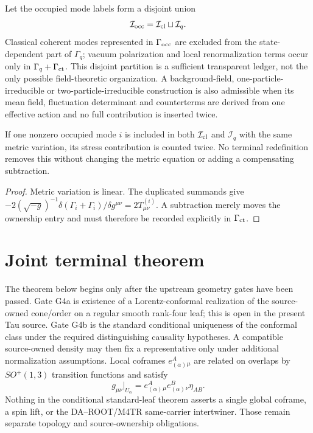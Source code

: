 Let the occupied mode labels form a disjoint union
\begin{equation}
\mathcal I_{\rm occ}=\mathcal I_{\rm cl}\sqcup\mathcal I_q.
\label{eq:partition}
\end{equation}
Classical coherent modes represented in $\Gamma_{\rm occ}$ are excluded from
the state-dependent part of $\Gamma_q$; vacuum polarization and local
renormalization terms occur only in $\Gamma_q+\Gamma_{\rm ct}$.
This disjoint partition is a sufficient transparent ledger, not the only
possible field-theoretic organization. A background-field, one-particle-
irreducible or two-particle-irreducible construction is also admissible when
its mean field, fluctuation determinant and counterterms are derived from one
effective action and no full contribution is inserted twice.

\begin{proposition}
If one nonzero occupied mode $i$ is included in both $\mathcal I_{\rm cl}$ and
$\mathcal I_q$ with the same metric variation, its stress contribution is
counted twice. No terminal redefinition removes this without changing the
metric equation or adding a compensating subtraction.
\end{proposition}
\begin{proof}
Metric variation is linear. The duplicated summands give
$-2(\sqrt{-g})^{-1}\delta(\Gamma_i+\Gamma_i)/\delta g^{\mu\nu}
=2T^{(i)}_{\mu\nu}$. A subtraction merely moves the ownership entry and must
therefore be recorded explicitly in $\Gamma_{\rm ct}$.
\end{proof}

\section{Joint terminal theorem}

The theorem below begins only after the upstream geometry gates have been
passed.  Gate G4a is existence of a Lorentz-conformal realization of the
source-owned cone/order on a regular smooth rank-four leaf; this is open in
the present Tau source.  Gate G4b is the standard conditional uniqueness of
the conformal class under the required distinguishing causality hypotheses.
A compatible source-owned density may then fix a representative only under
additional normalization assumptions.  Local coframes
$e_{(\alpha)}^A{}_{\mu}$ are related on overlaps by
$SO^+(1,3)$ transition functions and satisfy
\[
 g_{\mu\nu}|_{U_\alpha}
 =e_{(\alpha)}^A{}_{\mu}e_{(\alpha)}^B{}_{\nu}\eta_{AB}.
\]
Nothing in the conditional standard-leaf theorem asserts a single global
coframe, a spin lift, or the DA--ROOT/M4TR same-carrier intertwiner.  Those
remain separate topology and source-ownership obligations.

